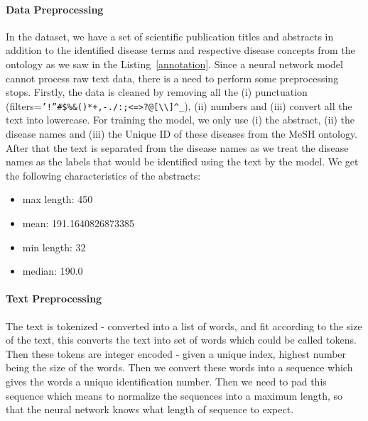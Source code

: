 \paragraph{Data Preprocessing}
In the dataset, we have a set of scientific publication titles and abstracts in addition to the identified disease terms and respective disease concepts from the ontology as we saw in the Listing~\ref{annotation}. 
Since a neural network model cannot process raw text data, there is a need to perform some preprocessing stops.
Firstly, the data is cleaned by removing all the (i) punctuation (filters=\verb|’!”#$%&()*+,-./:;<=>?@[\\]^_|), (ii) numbers and (iii) convert all the text into lowercase.  
For training the model, we only use (i) the abstract, (ii) the disease names and (iii) the Unique ID of these diseases from the MeSH ontology. After that the text is separated from the disease names as we treat the disease names as the labels that would be identified using the text by the model.
We get the following characteristics of the abstracts:
\begin{itemize}
    \item max length:  450
    \item mean:  191.1640826873385
    \item min length:  32
    \item median:  190.0
\end{itemize}
\paragraph{Text Preprocessing} The text is tokenized - converted into a list of words, and fit according to the size of the text, this converts the text into set of words which could be called tokens.
Then these tokens are integer encoded - given a unique index, highest number being the size of the words. 
Then we convert these words into a sequence which gives the words a unique identification number. Then we need to pad this sequence which means to normalize the sequences into a maximum length, so that the neural network knows what length of sequence to expect. 


